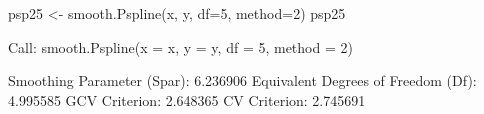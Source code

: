 \begin{Schunk}
\begin{Sinput}
 psp25 <- smooth.Pspline(x, y, df=5, method=2)
 psp25
\end{Sinput}
\begin{Soutput}
Call:
smooth.Pspline(x = x, y = y, df = 5, method = 2)

Smoothing Parameter (Spar): 6.236906 
Equivalent Degrees of Freedom (Df): 4.995585 
GCV Criterion: 2.648365 
CV  Criterion: 2.745691 
\end{Soutput}
\end{Schunk}
